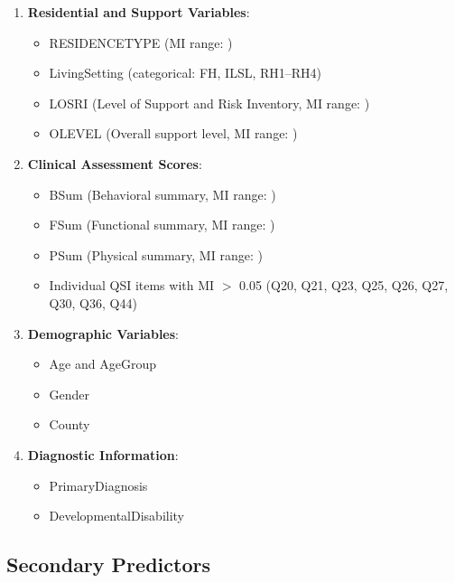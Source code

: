 \begin{enumerate}
    \item \textbf{Residential and Support Variables}:
    \begin{itemize}
        \item RESIDENCETYPE (MI range: \FSRangeMIRESIDENCETYPE)
        \item LivingSetting (categorical: FH, ILSL, RH1--RH4)
        \item LOSRI (Level of Support and Risk Inventory, MI range: \FSRangeMILOSRI)
        \item OLEVEL (Overall support level, MI range: \FSRangeMIOLEVEL)
    \end{itemize}
    
    \item \textbf{Clinical Assessment Scores}:
    \begin{itemize}
        \item BSum (Behavioral summary, MI range: \FSRangeMIBSum)
        \item FSum (Functional summary, MI range: \FSRangeMIFSum)
        \item PSum (Physical summary, MI range: \FSRangeMIPSum)
        \item Individual QSI items with MI $>$ 0.05 (Q20, Q21, Q23, Q25, Q26, Q27, Q30, Q36, Q44)
    \end{itemize}
    
    \item \textbf{Demographic Variables}:
    \begin{itemize}
        \item Age and AgeGroup
        \item Gender
        \item County
    \end{itemize}
    
    \item \textbf{Diagnostic Information}:
    \begin{itemize}
        \item PrimaryDiagnosis
        \item DevelopmentalDisability
    \end{itemize}
\end{enumerate}

\subsection{Secondary Predictors}
\label{subsec:secondary-predictors}

